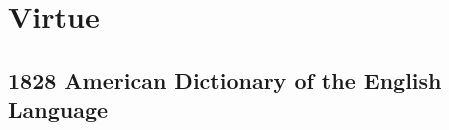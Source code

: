 \section{Virtue}
	\label{VIRTUE}
	

\subsection{1828 American Dictionary of the English Language} %
	\label{VIRTUE-1828}

